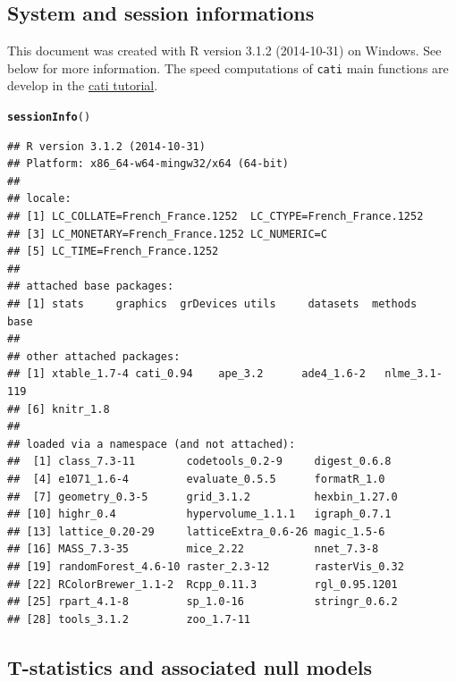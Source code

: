 \documentclass[12pt]{article}\usepackage[]{graphicx}\usepackage[]{color}
\makeatletter
\newcommand{\hlstd}[1]{\textcolor[rgb]{0.345,0.345,0.345}{#1}}%
\newcommand{\hlkwd}[1]{\textcolor[rgb]{0.737,0.353,0.396}{\textbf{#1}}}%
\newenvironment{kframe}{%
 \def\at@end@of@kframe{}%
 \ifinner\ifhmode%
  \def\at@end@of@kframe{\end{minipage}}%
  \begin{minipage}{\columnwidth}%
 \fi\fi%
 \def\FrameCommand##1{\hskip\@totalleftmargin \hskip-\fboxsep
 \colorbox{shadecolor}{##1}\hskip-\fboxsep
     \hskip-\linewidth \hskip-\@totalleftmargin \hskip\columnwidth}%
 \MakeFramed {\advance\hsize-\width
   \@totalleftmargin\z@ \linewidth\hsize
   \@setminipage}}%
 {\par\unskip\endMakeFramed%
 \at@end@of@kframe}
\newenvironment{knitrout}{}{} %
\makeatother
\begin{document}
  \subsection{System and session informations}
  This document was created with R version 3.1.2 (2014-10-31) on Windows. See below for more information. The speed computations of \texttt{cati} main functions are develop  in the \href{http://sourceforge.net/p/cati-r/code/ci/master/tree/tutorial/vignettes/vignette.pdf}{cati tutorial}.
  
\begin{knitrout}\small
{}\color{fgcolor}\begin{kframe}
\begin{alltt}
\hlkwd{sessionInfo}\hlstd{()}
\end{alltt}
\begin{verbatim}
## R version 3.1.2 (2014-10-31)
## Platform: x86_64-w64-mingw32/x64 (64-bit)
## 
## locale:
## [1] LC_COLLATE=French_France.1252  LC_CTYPE=French_France.1252   
## [3] LC_MONETARY=French_France.1252 LC_NUMERIC=C                  
## [5] LC_TIME=French_France.1252    
## 
## attached base packages:
## [1] stats     graphics  grDevices utils     datasets  methods   base     
## 
## other attached packages:
## [1] xtable_1.7-4 cati_0.94    ape_3.2      ade4_1.6-2   nlme_3.1-119
## [6] knitr_1.8   
## 
## loaded via a namespace (and not attached):
##  [1] class_7.3-11        codetools_0.2-9     digest_0.6.8       
##  [4] e1071_1.6-4         evaluate_0.5.5      formatR_1.0        
##  [7] geometry_0.3-5      grid_3.1.2          hexbin_1.27.0      
## [10] highr_0.4           hypervolume_1.1.1   igraph_0.7.1       
## [13] lattice_0.20-29     latticeExtra_0.6-26 magic_1.5-6        
## [16] MASS_7.3-35         mice_2.22           nnet_7.3-8         
## [19] randomForest_4.6-10 raster_2.3-12       rasterVis_0.32     
## [22] RColorBrewer_1.1-2  Rcpp_0.11.3         rgl_0.95.1201      
## [25] rpart_4.1-8         sp_1.0-16           stringr_0.6.2      
## [28] tools_3.1.2         zoo_1.7-11
\end{verbatim}
\end{kframe}
\end{knitrout}

  \subsection {T-statistics and associated null models}
  
\end{document}
